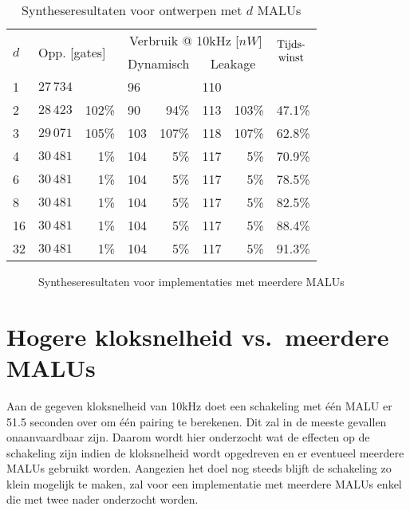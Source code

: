 \begin{table}[h]
	\caption{Syntheseresultaten voor ontwerpen met $d$ MALUs}
	\label{tabel-resultaten-md}

	\centering
	\begin{tabular}{llrlrlrl}
		\toprule
		\multirow{2}{*}{$d$} & \multicolumn{2}{l}{\multirow{2}{*}{Opp. [gates]}}	& \multicolumn{4}{c}{Verbruik @ 10kHz [$nW$]}	& \multirow{2}{*}{$\begin{array}{@{}c@{}}\text{Tijds-}\\\text{winst}\end{array}$}\\
		\cmidrule{4-7}
		&	& & \multicolumn{2}{c}{Dynamisch}	& \multicolumn{2}{c}{Leakage}	&\\
		\midrule
		1			& $27\,734$	& 			& 96	& 			& 110	& 			& \\
		2			& $28\,423$	& 102\%	& 90	& 94\%	& 113	& 103\%	& 47.1\%\\
		3			& $29\,071$	& 105\%	& 103	& 107\%	& 118	& 107\%	& 62.8\%\\
		4			& $30\,481$	& 1\%		& 104	& 5\%		& 117	& 5\%		& 70.9\%\\
		6			& $30\,481$	& 1\%		& 104	& 5\%		& 117	& 5\%		& 78.5\%\\
		8			& $30\,481$	& 1\%		& 104	& 5\%		& 117	& 5\%		& 82.5\%\\
		16			& $30\,481$	& 1\%		& 104	& 5\%		& 117	& 5\%		& 88.4\%\\
		32			& $30\,481$	& 1\%		& 104	& 5\%		& 117	& 5\%		& 91.3\%\\
		\hline		
	\end{tabular}
\end{table}

\begin{figure}[h]
	\centering
		\caption{Syntheseresultaten voor implementaties met meerdere MALUs\label{figuur-resultaten-md}}
\end{figure}

\section{Hogere kloksnelheid vs.\ meerdere MALUs}

Aan de gegeven kloksnelheid van 10kHz doet een schakeling met \'e\'en MALU er 51.5 seconden over om \'e\'en pairing te berekenen. Dit zal  in de meeste gevallen onaanvaardbaar zijn. Daarom wordt hier onderzocht wat de effecten op de schakeling zijn indien de kloksnelheid wordt opgedreven en er eventueel meerdere MALUs gebruikt worden. Aangezien het doel nog steeds blijft de schakeling zo klein mogelijk te maken, zal voor een implementatie met meerdere MALUs enkel die met twee nader onderzocht worden.

